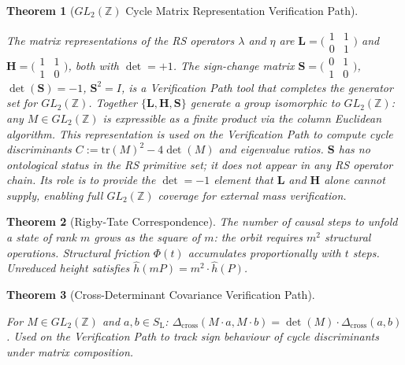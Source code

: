 \documentclass[11pt, letterpaper]{article}
\newcommand{\Z}{\mathbb{Z}}
\newcommand{\SL}{S_{\mathrm{L}}}
\newcommand{\lop}{\lambda}
\newcommand{\aop}{\eta}
\newcommand{\Dcross}{\Delta_{\mathrm{cross}}}
\theoremstyle{definition}
\theoremstyle{plain}
\newtheorem{theorem}{Theorem}[section]
\begin{document}
\begin{theorem}[$GL_2(\Z)$ Cycle Matrix Representation  Verification Path]
\label{thm:GL2}
\begin{verifybox}
The matrix representations of the RS operators $\lop$ and $\aop$ are
$\mathbf{L}=\bigl(\begin{smallmatrix}1&1\\0&1\end{smallmatrix}\bigr)$ and
$\mathbf{H}=\bigl(\begin{smallmatrix}1&1\\1&0\end{smallmatrix}\bigr)$,
both with $\det=+1$.  The sign-change matrix
$\mathbf{S}=\bigl(\begin{smallmatrix}0&1\\1&0\end{smallmatrix}\bigr)$,
$\det(\mathbf{S})=-1$, $\mathbf{S}^2=I$, is a Verification Path tool that
completes the generator set for $GL_2(\Z)$.  Together
$\{\mathbf{L},\mathbf{H},\mathbf{S}\}$ generate a group isomorphic to
$GL_2(\Z)$: any $M\in GL_2(\Z)$ is expressible as a finite product via the
column Euclidean algorithm.  This representation is used on the Verification
Path to compute cycle discriminants $C:=\mathrm{tr}(M)^2-4\det(M)$ and
eigenvalue ratios.  $\mathbf{S}$ has no ontological status in the RS primitive
set; it does not appear in any RS operator chain.  Its role is to provide
the $\det=-1$ element that $\mathbf{L}$ and $\mathbf{H}$ alone cannot supply,
enabling full $GL_2(\Z)$ coverage for external mass verification.
\end{verifybox}
\end{theorem}

\begin{theorem}[Rigby-Tate Correspondence]\label{thm:rigby-tate}
The number of causal steps to unfold a state of rank $m$ grows as the
square of $m$: the orbit requires $m^2$ structural operations.
Structural friction $\Phi(t)$ accumulates proportionally with $t$ steps.
Unreduced height satisfies $\hat{h}(mP) = m^2 \cdot \hat{h}(P)$.
\end{theorem}

\begin{theorem}[Cross-Determinant Covariance  Verification Path]
\label{thm:Dcross-cov}
\begin{verifybox}
For $M\in GL_2(\Z)$ and $a,b\in\SL$:
$\Dcross(M\cdot a,M\cdot b)=\det(M)\cdot\Dcross(a,b)$.
Used on the Verification Path to track sign behaviour of cycle discriminants
under matrix composition.
\end{verifybox}
\end{theorem}
\end{document}
